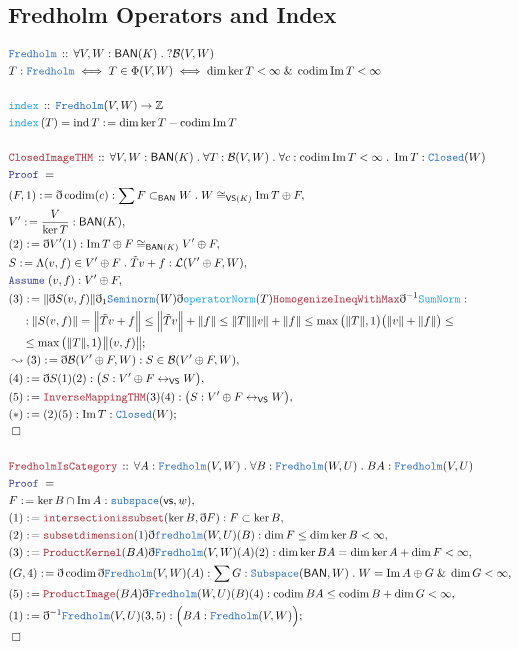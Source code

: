 \documentclass[12pt]{scrartcl}
\newcommand{\TYPE}[1]{\textcolor{NavyBlue}{\mathtt{#1}}}
\newcommand{\FUNC}[1]{\textcolor{Cerulean}{\mathtt{#1}}}
\newcommand{\LOGIC}[1]{\textcolor{Blue}{\mathtt{#1}}}
\newcommand{\THM}[1]{\textcolor{Maroon}{\mathtt{#1}}}
\renewcommand{\.}{\; . \;}
\newcommand{\de}{: \kern 0.1pc =}
\newcommand{\Act}[1]{\left( #1 \right)}
\newcommand{\Theorem}[2]{& \THM{#1} \, :: \, #2 \\ & \Proof = \\ }
\newcommand{\DeclareType}[2]{& \TYPE{#1} \, :: \, #2 \\}
\newcommand{\DefineNamedType}[4]{& #1 : \TYPE{#2} \iff #3 \iff #4 \\}
\newcommand{\DeclareFunc}[2]{& \FUNC{#1} \, :: \, #2 \\}
\newcommand{\DefineNamedFunc}[4]{&  \FUNC{#1}\Act{#2} = #3 \de #4 \\}
\newcommand{\NewLine}{\\ & \kern 1pc}
\newcommand{\Page}[1]{\begin{align*} #1 \end{align*} \newpage   }
\newcommand{ \bd }{ \ByDef }
\renewcommand{\And}{\; \& \;}
\newcommand{\Int}{\mathbb{Z} }
\DeclareMathOperator*{\im}{Im}
\newcommand{\ToBij}{\leftrightarrow}
\newcommand{\Say}[3]{& #1 \de #2 : #3, \\}
\newcommand{\Conclude}[3]{& #1 \de #2 : #3; \\}
\newcommand{\Derive}[3]{& \leadsto #1 \de #2 : #3, \\}
\newcommand{\A}{\LOGIC{Assume} \;}
\newcommand{\Assume}[2]{& \A #1 : #2, \\}
\newcommand{\QED}{\; \square}
\newcommand{\EndProof}{& \QED \\}
\newcommand{\ByDef}{\eth}
\newcommand{\Proof}{\LOGIC{Proof} \; }
\DeclareMathOperator{\codim}{codim}
\DeclareMathOperator{\ind}{ind}
\newcommand{\BAN}{\mathsf{BAN}} %
\newcommand{\B}{\mathcal{B}}
\begin{document}
\subsection{Fredholm Operators and Index}
\Page{
	\DeclareType{Fredholm}{\forall V,W : \BAN(K) \. ?\B(V,W)}
	\DefineNamedType{  T  }{ Fredholm}{T \in \Phi(V,W)}{\dim \ker T < \infty \And \codim \im T < \infty}
	\\
	\DeclareFunc{index}{ \TYPE{Fredholm}(V,W) \to \Int }
	\DefineNamedFunc{index}{T}{\ind T}{ \dim \ker T - \codim \im T}
	\\
	\Theorem{ClosedImageTHM}{ \forall V,W : \BAN(K) \. \forall T : \B(V,W) \. \forall c : \codim \im T < \infty \. \im T : \TYPE{Closed}(W)  }
	\Say{(F,1)}{ \bd \codim (c)  }{ \sum F \subset_{\BAN} W \. W \cong_{\mathsf{VS}(K)} \im T \oplus F }
	\Say{V'}{\frac{V}{\ker T}}{ \BAN(K) }
	\Say{(2)}{\bd V' (1)}{ \im T \oplus  F \cong_{\BAN(K)} V' \oplus F  }
	\Say{S}{\Lambda (v,f) \in V' \oplus F \. \tilde{T} v   + f }{\mathcal{L}(V' \oplus F,W)}
	\Assume{(v,f)}{V' \oplus F}
	\Conclude{(3)}{ \| \bd S(v,f)   \| \bd_1 \TYPE{Seminorm}(W) \bd \FUNC{operatorNorm}(T) \THM{HomogenizeIneqWithMax} \bd^{-1} \FUNC{SumNorm}  }{
		\NewLine :
		\|S(v,f) \| = 
		\Big\| \tilde{T} v + f \Big\| \le 
		\Big\| \tilde{T} v \Big\| + \|f\| \le
		\|T\|\|v\| + \| f\| \le
		\max\big( \|T\|, 1 \big)\big( \|v\| + \| f \| \big) \le \NewLine \le
		\max\big( \| T\|, 1 \big) \big\| (v,f) \big\| 
	}
      \Derive{(3)}{ \bd \B(V' \oplus F,W) }{S \in \B(V' \oplus F,W)}
      \Say{(4)}{ \bd S (1)(2)}{  \big(S : V' \oplus F \ToBij_{\mathsf{VS}} W \big )}
      \Say{(5)}{\THM{InverseMappingTHM}(3)(4)}{\big( S : V' \oplus F \ToBij_{\mathsf{VS}} W \big )}
      \Conclude{(*)}{(2)(5)}{\im T : \TYPE{Closed}(W)}
      \EndProof
      \\
      \Theorem{FredholmIsCategory}{ \forall A : \TYPE{Fredholm}(V,W) \. \forall B : \TYPE{Fredholm}(W,U) \. BA : \TYPE{Fredholm}(V,U)  }
      \Say{F}{\ker B \cap \im A   }{\TYPE{subspace}(\mathsf{vs},w)}
      \Say{(1)}{\THM{intersectionissubset}( \ker B,\bd F)}{ F \subset \ker B}
      \Say{(2)}{ \THM{subsetdimension}(1) \bd \TYPE{fredholm}(W,U)(B)}{ \dim F \le \dim \ker B < \infty  }
      \Say{(3)}{\THM{ProductKernel}(BA) \bd \TYPE{Fredholm}(V,W)(A)(2)}{ \dim \ker BA = \dim \ker A  + \dim F  < \infty  }
      \Say{ (G,4) }{ \bd \codim \bd \TYPE{Fredholm}(V,W)(A) }{ \sum G : \TYPE{Subspace}(\BAN,W) \. W =  \im A \oplus G \And \dim G < \infty  }
      \Say{(5)}{\THM{ProductImage}(BA) \bd \TYPE{Fredholm}(W,U)(B)(4)}{ \codim BA \le \codim B + \dim G  < \infty  }
      \Conclude{(1)}{ \bd^{-1} \TYPE{Fredholm}(V,U)(3,5)}{  \Big( BA : \TYPE{Fredholm}(V,W)  \Big)  }
      \EndProof
      }
\end{document}
